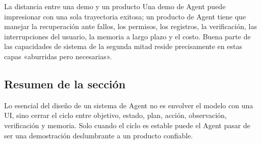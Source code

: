 \begin{warningbox}{La distancia entre una demo y un producto}
Una demo de Agent puede impresionar con una sola trayectoria exitosa; un producto de Agent tiene que manejar la recuperación ante fallos, los permisos, los registros, la verificación, las interrupciones del usuario, la memoria a largo plazo y el costo. Buena parte de las capacidades de sistema de la segunda mitad reside precisamente en estas capas «aburridas pero necesarias».
\end{warningbox}

\subsection{Resumen de la sección}

Lo esencial del diseño de un sistema de Agent no es envolver el modelo con una UI, sino cerrar el ciclo entre objetivo, estado, plan, acción, observación, verificación y memoria. Solo cuando el ciclo es estable puede el Agent pasar de ser una demostración deslumbrante a un producto confiable.
